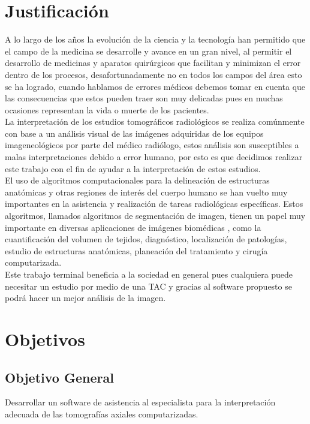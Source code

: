 \documentclass[12pt]{report}
\begin{document}
\section{Justificación}
A lo largo de los años la evolución de la ciencia y la tecnología han permitido que el campo de la medicina se desarrolle y avance en un gran nivel, al permitir el desarrollo de medicinas y aparatos quirúrgicos que facilitan y minimizan el error dentro de los procesos, desafortunadamente no en todos los campos del área esto se ha logrado, cuando hablamos de errores médicos debemos tomar en cuenta que las consecuencias que estos pueden traer son muy delicadas pues en muchas ocasiones representan la vida o muerte de los pacientes.\\ 

La interpretación de los estudios tomográficos radiológicos se realiza comúnmente con base a un análisis visual de las imágenes adquiridas de los equipos imageneológicos por parte del médico radiólogo, estos análisis son susceptibles a malas interpretaciones debido a error humano, por esto es que decidimos realizar este trabajo con el fin de ayudar a la interpretación de estos estudios.\\

El uso de algoritmos computacionales para la delineación de estructuras anatómicas y otras regiones de interés del cuerpo humano se han vuelto muy importantes en la asistencia y realización de tareas radiológicas específicas. Estos algoritmos, llamados algoritmos de segmentación de imagen, tienen un papel muy importante en diversas aplicaciones de imágenes biomédicas , como la cuantificación del volumen de tejidos, diagnóstico, localización de patologías, estudio de estructuras anatómicas, planeación del tratamiento y cirugía computarizada.\cite{metodos}\\ 

Este trabajo terminal beneficia a la sociedad en general pues cualquiera puede necesitar un estudio por medio de una TAC y gracias al software propuesto se  podrá hacer un mejor análisis de la imagen.

\section{Objetivos}
\subsection{Objetivo General}
Desarrollar un software de asistencia al especialista para la interpretación adecuada de las tomografías axiales computarizadas.
\end{document}
